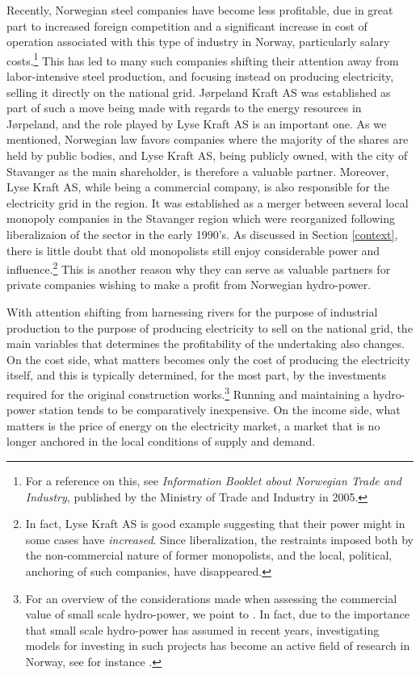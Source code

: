 Recently, Norwegian steel companies have become less profitable, due in great part to increased foreign competition and a significant increase in cost of operation associated with this type of industry in Norway, particularly salary costs.\footnote{For a reference on this, see \emph{Information Booklet about Norwegian Trade and Industry}, published by the Ministry of Trade and Industry in 2005.} This has led to many such companies shifting their attention away from labor-intensive steel production, and focusing instead on producing electricity, selling it directly on the national grid. Jørpeland Kraft AS was established as part of such a move being made with regards to the energy resources in Jørpeland, and the role played by Lyse Kraft AS is an important one. As we mentioned, Norwegian law favors companies where the majority of the shares are held by public bodies, and Lyse Kraft AS, being publicly owned, with the city of Stavanger as the main shareholder, is therefore a valuable partner. Moreover, Lyse Kraft AS, while being a commercial company, is also responsible for the electricity grid in the region. It was established as a merger between several local monopoly companies in the Stavanger region which were reorganized following liberalizaion of the sector in the early 1990's. As discussed in Section \ref{context}, there is little doubt that old monopolists still enjoy considerable power and influence.\footnote{In fact, Lyse Kraft AS is good example suggesting that their power might in some cases have \emph{increased}. Since liberalization, the restraints imposed both by the non-commercial nature of former monopolists, and the local, political, anchoring of such companies, have disappeared.} This is another reason why they can serve as valuable partners for private companies wishing to make a profit from Norwegian hydro-power.

With attention shifting from harnessing rivers for the purpose of industrial production to the purpose of producing electricity to sell on the national grid, the main variables that determines the profitability of the undertaking also changes. On the cost side, what matters becomes only the cost of producing the electricity itself, and this is typically determined, for the most part, by the investments required for the original construction works.\footnote{For an overview of the considerations made when assessing the commercial value of small scale hydro-power, we point to \cite{kartlegging}. In fact, due to the importance that small scale hydro-power has assumed in recent years, investigating models for investing in such projects has become an active field of research in Norway, see for instance \cite{investment}.} Running and maintaining a hydro-power station tends to be comparatively inexpensive. On the income side, what matters is the price of energy on the electricity market, a market that is no longer anchored in the local conditions of supply and demand.

